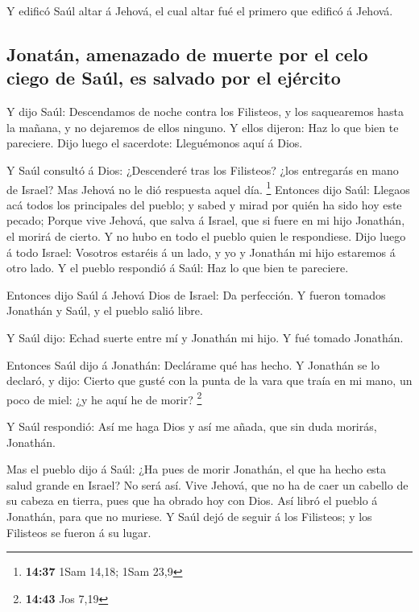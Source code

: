  Y edificó Saúl altar á Jehová, el cual altar fué el
primero que edificó á Jehová.

\hypertarget{jonatuxe1n-amenazado-de-muerte-por-el-celo-ciego-de-sauxfal-es-salvado-por-el-ejuxe9rcito}{%
\subsection{Jonatán, amenazado de muerte por el celo ciego de Saúl, es
salvado por el
ejército}\label{jonatuxe1n-amenazado-de-muerte-por-el-celo-ciego-de-sauxfal-es-salvado-por-el-ejuxe9rcito}}

 Y dijo Saúl: Descendamos de noche contra los Filisteos,
y los saquearemos hasta la mañana, y no dejaremos de ellos ninguno. Y
ellos dijeron: Haz lo que bien te pareciere. Dijo luego el sacerdote:
Lleguémonos aquí á Dios.

 Y Saúl consultó á Dios: ¿Descenderé tras los Filisteos?
¿los entregarás en mano de Israel? Mas Jehová no le dió respuesta aquel
día. \footnote{\textbf{14:37} 1Sam 14,18; 1Sam 23,9} 
Entonces dijo Saúl: Llegaos acá todos los principales del pueblo; y
sabed y mirad por quién ha sido hoy este pecado;  Porque
vive Jehová, que salva á Israel, que si fuere en mi hijo Jonathán, el
morirá de cierto. Y no hubo en todo el pueblo quien le respondiese.
 Dijo luego á todo Israel: Vosotros estaréis á un lado, y
yo y Jonathán mi hijo estaremos á otro lado. Y el pueblo respondió á
Saúl: Haz lo que bien te pareciere.

 Entonces dijo Saúl á Jehová Dios de Israel: Da
perfección. Y fueron tomados Jonathán y Saúl, y el pueblo salió libre.

 Y Saúl dijo: Echad suerte entre mí y Jonathán mi hijo. Y
fué tomado Jonathán.

 Entonces Saúl dijo á Jonathán: Declárame qué has hecho.
Y Jonathán se lo declaró, y dijo: Cierto que gusté con la punta de la
vara que traía en mi mano, un poco de miel: ¿y he aquí he de morir?
\footnote{\textbf{14:43} Jos 7,19}

 Y Saúl respondió: Así me haga Dios y así me añada, que
sin duda morirás, Jonathán.

 Mas el pueblo dijo á Saúl: ¿Ha pues de morir Jonathán,
el que ha hecho esta salud grande en Israel? No será así. Vive Jehová,
que no ha de caer un cabello de su cabeza en tierra, pues que ha obrado
hoy con Dios. Así libró el pueblo á Jonathán, para que no muriese.
 Y Saúl dejó de seguir á los Filisteos; y los Filisteos
se fueron á su lugar.

